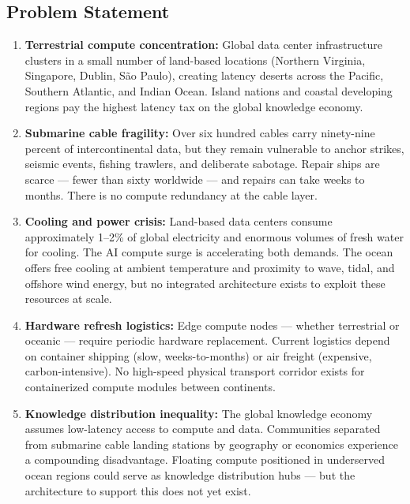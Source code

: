 \documentclass[11pt,letterpaper]{article}
\begin{document}
\subsection{Problem Statement}

\begin{enumerate}[leftmargin=2em]
  \item \textbf{Terrestrial compute concentration:} Global data center infrastructure clusters in a small number of land-based locations (Northern Virginia, Singapore, Dublin, São Paulo), creating latency deserts across the Pacific, Southern Atlantic, and Indian Ocean. Island nations and coastal developing regions pay the highest latency tax on the global knowledge economy.

  \item \textbf{Submarine cable fragility:} Over six hundred cables carry ninety-nine percent of intercontinental data, but they remain vulnerable to anchor strikes, seismic events, fishing trawlers, and deliberate sabotage. Repair ships are scarce --- fewer than sixty worldwide --- and repairs can take weeks to months. There is no compute redundancy at the cable layer.

  \item \textbf{Cooling and power crisis:} Land-based data centers consume approximately 1--2\% of global electricity and enormous volumes of fresh water for cooling. The AI compute surge is accelerating both demands. The ocean offers free cooling at ambient temperature and proximity to wave, tidal, and offshore wind energy, but no integrated architecture exists to exploit these resources at scale.

  \item \textbf{Hardware refresh logistics:} Edge compute nodes --- whether terrestrial or oceanic --- require periodic hardware replacement. Current logistics depend on container shipping (slow, weeks-to-months) or air freight (expensive, carbon-intensive). No high-speed physical transport corridor exists for containerized compute modules between continents.

  \item \textbf{Knowledge distribution inequality:} The global knowledge economy assumes low-latency access to compute and data. Communities separated from submarine cable landing stations by geography or economics experience a compounding disadvantage. Floating compute positioned in underserved ocean regions could serve as knowledge distribution hubs --- but the architecture to support this does not yet exist.
\end{enumerate}
\end{document}

